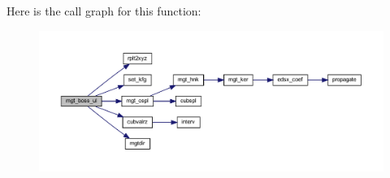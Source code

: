Here is the call graph for this function\+:\nopagebreak
\begin{figure}[H]
\begin{center}
\leavevmode
\includegraphics[width=350pt]{Leroi__c_8f90_adec9f2398e7872ff5617d3c0adffba35_cgraph}
\end{center}
\end{figure}
\mbox{\label{Leroi__c_8f90_afd2db4ed971ee6e92ca6da7bece2caff}} 
